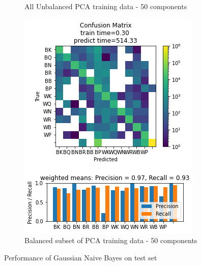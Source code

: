 \documentclass{article}
\newcommand{\FIGLABEL}[1]{Performance of #1 on test set}
\newcommand{\PCAFL}{All Unbalanced PCA training data - 50 components}
\newcommand{\PCABL}{Balanced subset of PCA training data - 50 components}
\begin{document}
\begin{figure}[h]
\begin{subfigure}{0.33\textwidth}
\caption{\PCAFL}
\end{subfigure}
\begin{subfigure}{0.33\textwidth}
\includegraphics[width=0.9\linewidth]{GNB_B_PCA50c_160x160_evaluation.png} 
\caption{\PCABL}
\end{subfigure}
\caption{\FIGLABEL{Gaussian Naive Bayes}}
\label{fig:GNB}
\end{figure}
\end{document}
